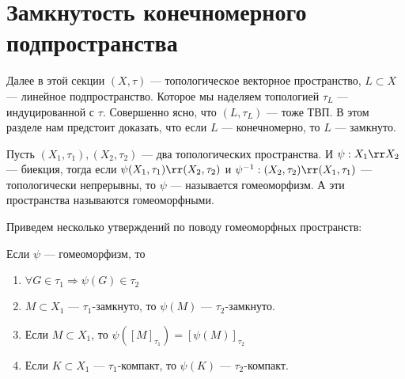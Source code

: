 \newpage
\section{Замкнутость конечномерного подпространства}
Далее в этой секции $(X, \tau)$ --- топологическое векторное пространство, $L \subset X$ --- линейное подпространство. Которое мы наделяем топологией $\tau_L$ --- индуцированной с $\tau$. Совершенно ясно, что $(L, \tau_L)$ --- тоже ТВП. В этом разделе нам предстоит доказать, что если $L$ --- конечномерно, то $L$ --- замкнуто.
\begin{definition}
	Пусть $(X_1, \tau_1), (X_2, \tau_2)$ --- два топологических пространства. И $\psi: X_1 \rr X_2$ --- биекция, тогда если $ \psi (X_1, \tau_1) \rr (X_2, \tau_2)$ и $\psi^{-1}: (X_2, \tau_2) \rr (X_1, \tau_1)$ --- топологически непрерывны, то $\psi$ --- называется гомеоморфизм. А эти пространства называются гомеоморфными.
\end{definition}
Приведем несколько утверждений по поводу гомеоморфных пространств:
\begin{claim}
	Если $\psi$ --- гомеоморфизм, то 
	\begin{enumerate}
		\item $\forall G \in \tau_1 \Rightarrow \psi(G) \in \tau_2 $
		\item $M \subset X_1$ --- $\tau_1$-замкнуто, то $\psi(M)$ --- $\tau_2$-замкнуто. 
		\item Если $M \subset X_1$, то $\psi\left([M]_{\tau_1}\right) = \left[\psi(M)\right]_{\tau_2}$
		\item Если $K \subset X_1$ --- $\tau_1$-компакт, то $\psi(K)$ --- $\tau_2$-компакт.
	\end{enumerate}
\end{claim}
